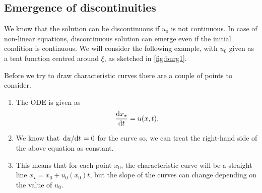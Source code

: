 \documentclass[justified, nobib, a4page]{tufte-handout}
\begin{document}
\subsection{Emergence of discontinuities}
We know that the solution can be discontinuous if \(u_0\) is not continuous. In
case of non-linear equations, discontinuous solution can emerge even if the
initial condition is continuous. We will consider the following example, with
\(u_0\) given as a tent function centred around \(\xi\), as sketched in
\cref{fig:burg1}.

\begin{marginfigure}
	\begin{center}
	\end{center}
	\caption{Initial field for the Burgers equation example.}\label{fig:burg1}
\end{marginfigure}

Before we try to draw characteristic curves there are a couple of points to
consider.
\begin{enumerate}
	\item The ODE is given as
	      \[
		      \odv{x_\star}{t} = u(x, t).
	      \]
	\item We know that \(\odv{u}/{t} = 0\) for the curve so, we can treat the
	      right-hand side of the above equation as constant.
	\item This means that for each point \(x_0\), the characteristic curve will
	      be a straight line \(x_\star = x_0 + u_0(x_0)t\), but the slope of the curves
	      can change depending on the value of \(u_0\).
\end{enumerate}
\end{document}
